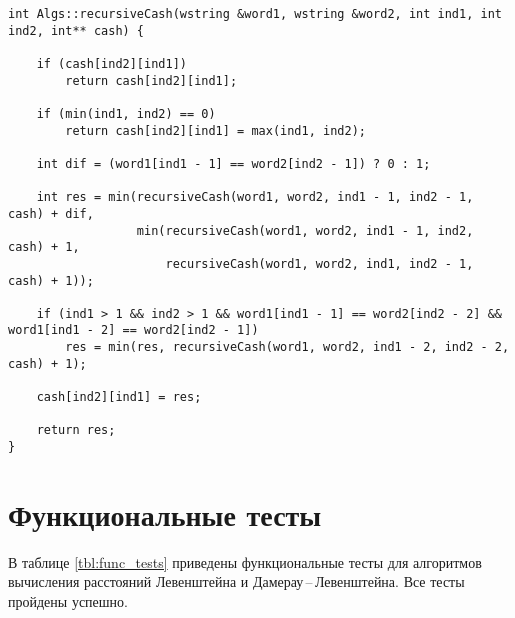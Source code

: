 \clearpage

\begin{lstlisting}[label=lst:dameray_lev_rec_hash,caption=Функция нахождения расстояния Дамерау\,--\,Левенштейна рекурсивно c кешированием]
int Algs::recursiveCash(wstring &word1, wstring &word2, int ind1, int ind2, int** cash) {

    if (cash[ind2][ind1])
        return cash[ind2][ind1];

    if (min(ind1, ind2) == 0)
        return cash[ind2][ind1] = max(ind1, ind2);

    int dif = (word1[ind1 - 1] == word2[ind2 - 1]) ? 0 : 1;

    int res = min(recursiveCash(word1, word2, ind1 - 1, ind2 - 1, cash) + dif,
                  min(recursiveCash(word1, word2, ind1 - 1, ind2, cash) + 1, 
                      recursiveCash(word1, word2, ind1, ind2 - 1, cash) + 1));

    if (ind1 > 1 && ind2 > 1 && word1[ind1 - 1] == word2[ind2 - 2] && word1[ind1 - 2] == word2[ind2 - 1])
        res = min(res, recursiveCash(word1, word2, ind1 - 2, ind2 - 2, cash) + 1);

    cash[ind2][ind1] = res;

    return res;
}
\end{lstlisting}

\clearpage

\section{Функциональные тесты}

В таблице \ref{tbl:func_tests} приведены функциональные тесты для алгоритмов вычисления расстояний Левенштейна и Дамерау\,--\,Левенштейна. Все тесты пройдены успешно.

